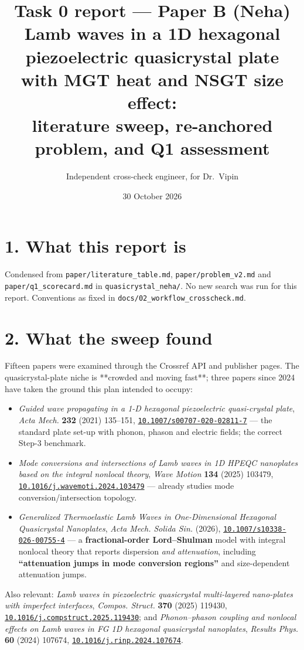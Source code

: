 \documentclass[11pt]{article}
\title{\vspace{-1.2cm}\textbf{Task 0 report --- Paper B (Neha)}\\[2pt]
\large Lamb waves in a 1D hexagonal piezoelectric quasicrystal plate with MGT heat and NSGT size
effect:\\literature sweep, re-anchored problem, and Q1 assessment}
\author{Independent cross-check engineer, for Dr.\ Vipin}
\date{30 October 2026}
\newcommand{\doi}[1]{\href{https://doi.org/#1}{\texttt{#1}}}
\begin{document}
\maketitle
\vspace{-0.5cm}

\section*{1. What this report is}
Condensed from \texttt{paper/literature\_table.md}, \texttt{paper/problem\_v2.md} and
\texttt{paper/q1\_scorecard.md} in \texttt{quasicrystal\_neha/}. No new search was run for this
report. Conventions as fixed in \texttt{docs/02\_workflow\_crosscheck.md}.

\section*{2. What the sweep found}
Fifteen papers were examined through the Crossref API and publisher pages. The quasicrystal-plate
niche is **crowded and moving fast**; three papers since 2024 have taken the ground this plan
intended to occupy:

\begin{itemize}\small
\item \emph{Guided wave propagating in a 1-D hexagonal piezoelectric quasi-crystal plate},
  \emph{Acta Mech.} \textbf{232} (2021) 135--151, \doi{10.1007/s00707-020-02811-7} --- the standard
  plate set-up with phonon, phason and electric fields; the correct Step-3 benchmark.
\item \emph{Mode conversions and intersections of Lamb waves in 1D HPEQC nanoplates based on the
  integral nonlocal theory}, \emph{Wave Motion} \textbf{134} (2025) 103479,
  \doi{10.1016/j.wavemoti.2024.103479} --- already studies mode conversion/intersection topology.
\item \emph{Generalized Thermoelastic Lamb Waves in One-Dimensional Hexagonal Quasicrystal
  Nanoplates}, \emph{Acta Mech. Solida Sin.} (2026), \doi{10.1007/s10338-026-00755-4} --- a
  \textbf{fractional-order Lord--Shulman} model with integral nonlocal theory that reports
  dispersion \emph{and attenuation}, including \textbf{``attenuation jumps in mode conversion
  regions''} and size-dependent attenuation jumps.
\end{itemize}

\noindent Also relevant: \emph{Lamb waves in piezoelectric quasicrystal multi-layered nano-plates
with imperfect interfaces}, \emph{Compos. Struct.} \textbf{370} (2025) 119430,
\doi{10.1016/j.compstruct.2025.119430}; and \emph{Phonon--phason coupling and nonlocal effects on
Lamb waves in FG 1D hexagonal quasicrystal nanoplates}, \emph{Results Phys.} \textbf{60} (2024)
107674, \doi{10.1016/j.rinp.2024.107674}.
\end{document}
